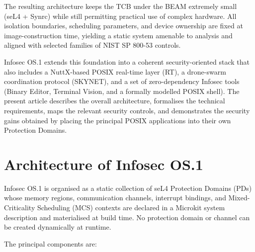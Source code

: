 \documentclass{article}
\begin{document}
The resulting architecture keeps the TCB under the BEAM extremely small
(seL4 + Synrc) while still permitting practical use of complex hardware.
All isolation boundaries, scheduling parameters, and device ownership are
fixed at image-construction time, yielding a static system amenable to
analysis and aligned with selected families of NIST SP 800-53 controls.

Infosec OS.1 extends this foundation into a coherent security-oriented stack
that also includes a NuttX-based POSIX real-time layer (RT), a drone-swarm
coordination protocol (SKYNET), and a set of zero-dependency Infosec tools
(Binary Editor, Terminal Vision, and a formally modelled POSIX shell).
The present article describes the overall architecture, formalises the
technical requirements, maps the relevant security controls, and demonstrates
the security gains obtained by placing the principal POSIX applications into
their own Protection Domains.

\section{Architecture of Infosec OS.1}

Infosec OS.1 is organised as a static collection of seL4 Protection Domains
(PDs) whose memory regions, communication channels, interrupt bindings, and
Mixed-Criticality Scheduling (MCS) contexts are declared in a Microkit system
description and materialised at build time. No protection domain or channel
can be created dynamically at runtime.

The principal components are:
\end{document}
